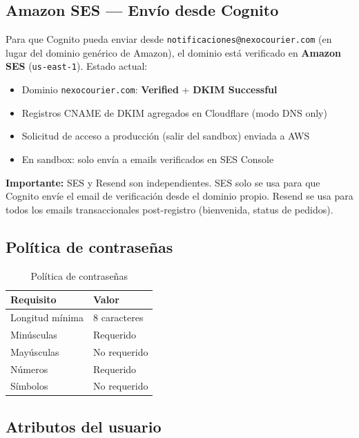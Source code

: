 \documentclass[12pt,a4paper]{article}
\begin{document}
\subsection{Amazon SES --- Envío desde Cognito}

Para que Cognito pueda enviar desde \texttt{notificaciones@nexocourier.com} (en lugar
del dominio genérico de Amazon), el dominio está verificado en \textbf{Amazon SES}
(\texttt{us-east-1}). Estado actual:

\begin{itemize}
  \item Dominio \texttt{nexocourier.com}: \textbf{Verified} + \textbf{DKIM Successful}
  \item Registros CNAME de DKIM agregados en Cloudflare (modo DNS only)
  \item Solicitud de acceso a producción (salir del sandbox) enviada a AWS
  \item En sandbox: solo envía a emails verificados en SES Console
\end{itemize}

\begin{nexobox}
\textbf{Importante:} SES y Resend son independientes. SES solo se usa para que
Cognito envíe el email de verificación desde el dominio propio. Resend se usa para
todos los emails transaccionales post-registro (bienvenida, status de pedidos).
\end{nexobox}

\subsection{Política de contraseñas}

\begin{table}[H]
\centering
\begin{tabular}{@{}ll@{}}
\toprule
\textbf{Requisito} & \textbf{Valor} \\
\midrule
Longitud mínima & 8 caracteres \\
Minúsculas & Requerido \\
Mayúsculas & No requerido \\
Números & Requerido \\
Símbolos & No requerido \\
\bottomrule
\end{tabular}
\caption{Política de contraseñas}
\end{table}

\subsection{Atributos del usuario}
\end{document}
